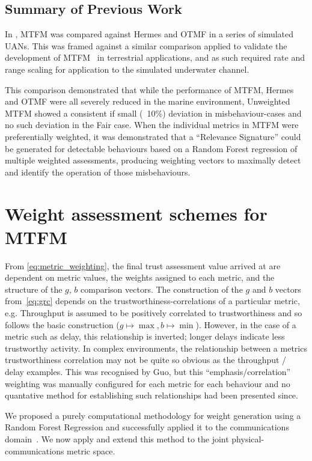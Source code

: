 \documentclass[conference]{IEEEtran}
\begin{document}
\subsection{Summary of Previous Work}
In \cite{Bolster2015}, MTFM was compared against Hermes and OTMF in a series of simulated UANs. 
This was framed against a similar comparison applied to validate the development of MTFM~\cite{Guo2012} in terrestrial applications, and as such required rate and range scaling for application to the simulated underwater channel.

This comparison demonstrated that while the performance of MTFM, Hermes and OTMF were all severely reduced in the marine environment, Unweighted MTFM showed a consistent if small (~10\%) deviation in misbehaviour-cases and no such deviation in the Fair case.
When the individual metrics in MTFM were preferentially weighted, it was demonstrated that a ``Relevance Signature'' could be generated for detectable behaviours based on a Random Forest regression of multiple weighted assessments, producing weighting vectors to maximally detect and identify the operation of those misbehaviours.

\section{Weight assessment schemes for MTFM}\label{sec:weight_ass}

From \eqref{eq:metric_weighting}, the final trust assessment value arrived at are dependent on metric values, the weights assigned to each metric, and the structure of the $g$, $b$ comparison vectors.
The construction of the $g$ and $b$ vectors from~\ref{eq:grc} depends on the trustworthiness-correlations of a particular metric, e.g. Throughput is assumed to be positively correlated to trustworthiness and so follows the basic construction ($g \mapsto \max, b \mapsto \min$).
However, in the case of a metric such as delay, this relationship is inverted; longer delays indicate less trustworthy activity.
In complex environments, the relationship between a metrics trustworthiness correlation may not be quite so obvious as the throughput / delay examples.
This was recognised by Guo, but this ``emphasis/correlation'' weighting was manually configured for each metric for each behaviour and no quantative method for establishing such relationships had been presented since.

We proposed a purely computational methodology for weight generation using a Random Forest Regression and successfully applied it to the communications domain~\cite{Bolster2015}.
We now apply and extend this method to the joint physical-communications metric space.
\end{document}
